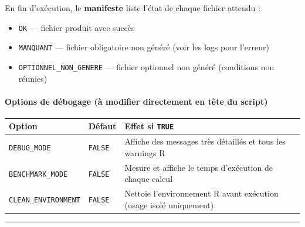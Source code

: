 En fin d'exécution, le \textbf{manifeste} liste l'état de chaque fichier
attendu :

\begin{itemize}
\tightlist
\item
  \texttt{OK} --- fichier produit avec succès
\item
  \texttt{MANQUANT} --- fichier obligatoire non généré (voir les logs
  pour l'erreur)
\item
  \texttt{OPTIONNEL\_NON\_GENERE} --- fichier optionnel non généré
  (conditions non réunies)
\end{itemize}

\paragraph{Options de débogage (à modifier directement en tête du
script)}\label{options-de-duxe9bogage-uxe0-modifier-directement-en-tuxeate-du-script}

{\def\LTcaptype{none} %
\begin{longtable}[]{@{}
  >{\raggedright\arraybackslash}p{}
  >{\raggedright\arraybackslash}p{}
  >{\raggedright\arraybackslash}p{}@{}}
\toprule\noalign{}
\begin{minipage}[b]{\linewidth}\raggedright
Option
\end{minipage} & \begin{minipage}[b]{\linewidth}\raggedright
Défaut
\end{minipage} & \begin{minipage}[b]{\linewidth}\raggedright
Effet si \texttt{TRUE}
\end{minipage} \\
\midrule\noalign{}
\endhead
\bottomrule\noalign{}
\endlastfoot
\texttt{DEBUG\_MODE} & \texttt{FALSE} & Affiche des messages très
détaillés et tous les warnings R \\
\texttt{BENCHMARK\_MODE} & \texttt{FALSE} & Mesure et affiche le temps
d'exécution de chaque calcul \\
\texttt{CLEAN\_ENVIRONMENT} & \texttt{FALSE} & Nettoie l'environnement R
avant exécution (usage isolé uniquement) \\
\end{longtable}
}

\begin{center}\rule{0.5\linewidth}{0.5pt}\end{center}

